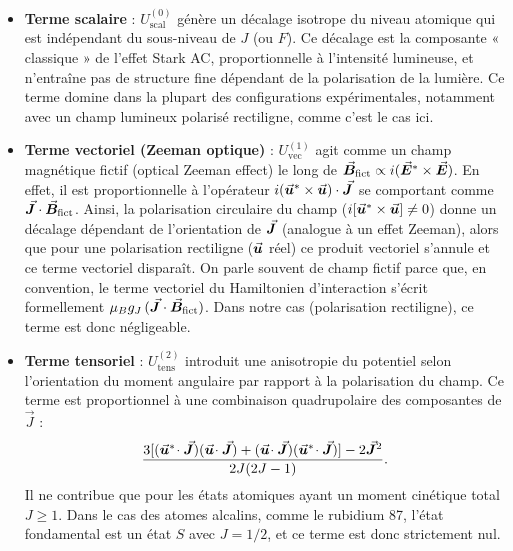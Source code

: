\begin{itemize}[label = $\bullet$]
  \item \textbf{Terme scalaire} : $U_{\mathrm{scal}}^{(0)}$ génère un décalage isotrope du niveau atomique qui est indépendant du sous-niveau de $J$ (ou $F$). Ce décalage est la composante « classique » de l’effet Stark AC, proportionnelle à l’intensité lumineuse, et n’entraîne pas de structure fine dépendant de la polarisation de la lumière. Ce terme domine dans la plupart des configurations expérimentales, notamment avec un champ lumineux polarisé rectiligne, comme c’est le cas ici.

  \item \textbf{Terme vectoriel (Zeeman optique)} : $U_{\mathrm{vec}}^{(1)}$ agit comme un champ magnétique fictif (optical Zeeman effect) le long de $\vec{{\bm{B}}}_{\rm fict}\propto i(\vec{{\bm{E}}}^\ast\times \vec{{\bm{E}}})$. En effet, il est proportionnelle à l’opérateur $i(\vec{{\bm{u}}}^\ast\times\vec{{\bm{u}}})\cdot\vec{{\bm{J}}}$ se comportant comme $\vec{{\bm{J}}}\cdot \vec{{\bm{B}}}_{\rm fict}$. Ainsi, la polarisation circulaire du champ ($i[\vec{{\bm{u}}}^\ast\times\vec{{\bm{u}}}]\neq 0$) donne un décalage dépendant de l’orientation de $\vec{{\bm{J}}}$ (analogue à un effet Zeeman), alors que pour une polarisation rectiligne ($\vec{{\bm{u}}}$ réel) ce produit vectoriel s’annule et ce terme vectoriel disparaît. On parle souvent de champ fictif parce que, en convention, le terme vectoriel du Hamiltonien d’interaction s’écrit formellement $\mu_B g_J\,(\vec{{\bm{J}}}\cdot\vec{{\bm{B}}}_{\rm fict})$. Dans notre cas (polarisation rectiligne), ce terme est donc négligeable.

  \item \textbf{Terme tensoriel} : $U_{\mathrm{tens}}^{(2)}$ introduit une anisotropie du potentiel selon l’orientation du moment angulaire par rapport à la polarisation du champ. Ce terme est proportionnel à une combinaison quadrupolaire des composantes de $\vec{J}$ :
\[
\frac{3[(\vec{{\bm{u}}}^*\!\cdot \vec{{\bm{J}}})(\vec{{\bm{u}}}\!\cdot\vec{{\bm{J}}})+(\vec{{\bm{u}}}\!\cdot\vec{{\bm{J}}})(\vec{{\bm{u}}}^*\!\cdot \vec{{\bm{J}}})]-2\vec{{\bm{J}}}^2}{2J(2J-1)}.
\]
Il ne contribue que pour les états atomiques ayant un moment cinétique total $J \geq 1$. Dans le cas des atomes alcalins, comme le rubidium 87, l’état fondamental est un état $S$ avec $J = 1/2$, et ce terme est donc strictement nul. 


\end{itemize}

